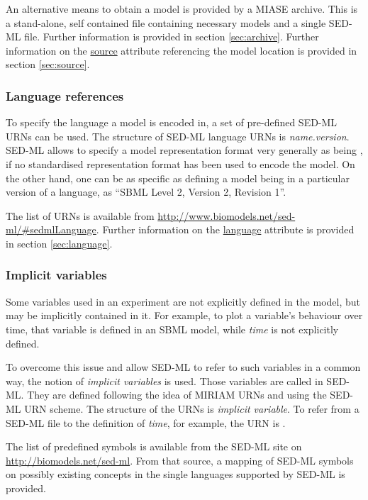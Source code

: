 An alternative means to obtain a model is provided by a MIASE archive. This is a stand-alone, self contained file containing necessary models and a single SED-ML file.  Further information is provided in section \ref{sec:archive}.
Further information on the \hyperref[sec:source]{source} attribute referencing the model location is provided in section \ref{sec:source}.

\subsubsection{Language references}
\label{sec:languageURI}
To specify the language a model is encoded in, a set of pre-defined SED-ML URNs can be used. 
The structure of SED-ML language URNs is \emph{name.version}. 
SED-ML allows to specify a model representation format very generally as being , if no standardised representation format has been used to encode the model. On the other hand, one can be as specific as defining
a model being in a particular version of a language, as ``SBML Level 2, Version 2, Revision 1''.

The list of URNs is available from \url{http://www.biomodels.net/sed-ml/#sedmlLanguage}. 
Further information on the \hyperref[sec:language]{language} attribute is provided in section \ref{sec:language}.

\subsubsection{Implicit variables}
\label{sec:implicitVariable}

Some variables used in an experiment are not explicitly defined in the model, but may be implicitly contained in it. 
For example, to plot a variable's behaviour over time, that variable is defined in an SBML model, while \emph{time} is not explicitly defined. 

To overcome this issue and allow SED-ML to refer to such variables in a common way, the notion of \emph{implicit variables} is used.
Those variables are called  in SED-ML. They are defined following the idea of MIRIAM URNs and using the SED-ML URN scheme. The structure of the URNs is \emph{implicit variable}.
To refer from a SED-ML file to the definition of \emph{time}, for example, the URN is .

The list of predefined symbols is available from the SED-ML site on \url{http://biomodels.net/sed-ml}.
From that source, a mapping of SED-ML symbols on possibly existing concepts in the single languages supported by SED-ML is provided.

